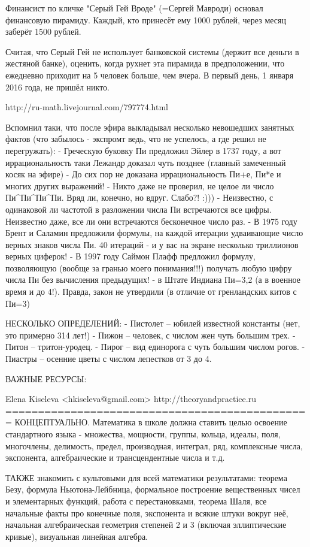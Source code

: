 Финансист по кличке "Серый Гей Вроде" (=Сергей Мавроди) основал финансовую 
пирамиду. Каждый, кто принесёт ему 1000 рублей, через месяц заберёт 1500 рублей.

Считая, что Серый Гей не использует банковской системы (держит все деньги в жестяной
банке), оценить, когда рухнет эта пирамида в предположении, что ежедневно приходит на 
5 человек больше, чем вчера. В первый день, 1 января 2016 года, не пришёл никто.

http://ru-math.livejournal.com/797774.html

Вспомнил таки, что после эфира выкладывал несколько невошедших
занятных фактов (что забылось - экспромт ведь, что не успелось, а
где решил не перегружать):
- Греческую буковку Пи предложил Эйлер в 1737 году, а вот иррациональность
таки Лежандр доказал чуть позднее (главный замеченный косяк на эфире)
- До сих пор не доказана иррациональность Пи+е, Пи*е и многих других выражений!
- Никто даже не проверил, не целое ли число Пи^Пи^Пи^Пи. Вряд ли, конечно, но вдруг. Слабо?! :)))
- Неизвестно, с одинаковой ли частотой в разложении числа Пи встречаются все цифры.
Неизвестно даже, все ли они встречаются бесконечное число раз.
- В 1975 году Брент и Саламин предложили формулы, на каждой итерации удваивающие
число верных знаков числа Пи. 40 итераций - и у вас на экране несколько триллионов
верных циферок!
- В 1997 году Саймон Плафф предложил формулу, позволяющую (вообще за гранью
моего понимания!!!) получать любую цифру числа Пи без вычисления предыдущих!
- в Штате Индиана Пи=3,2 (а в военное время и до 4!). Правда, закон не утвердили
(в отличие от гренландских китов с Пи=3)

НЕСКОЛЬКО ОПРЕДЕЛЕНИЙ:
- Пистолет – юбилей известной константы (нет, это примерно 314 лет!)
- Пижон – человек, с числом жен чуть большим трех.
- Питон – тритон-уродец.
- Пирог – вид единорога с чуть большим числом рогов.
- Пиастры – осенние цветы с числом лепестков от 3 до 4.

ВАЖНЫЕ РЕСУРСЫ:

Elena Kiseleva <hkiseleva@gmail.com> http://theoryandpractice.ru
===============================================
КОНЦЕПТУАЛЬНО. Математика в школе должна ставить целью освоение
стандартного языка - множества, мощности, группы, кольца, идеалы, поля, 
многочлены, делимость, предел, производная, интеграл, ряд, комплексные
числа, экспонента, алгебраические и трансцендентные числа и т.д. 

ТАКЖЕ знакомить с культовыми для всей математики результатами:
теорема Безу, формула Ньютона-Лейбница, формальное построение 
вещественных чисел и элементарных функций, работа с перестановками, 
теорема Шаля, все начальные факты про конечные поля, экспонента и
всякие штуки вокруг неё, начальная алгебраическая геометрия степеней
2 и 3 (включая эллиптические кривые), визуальная линейная алгебра.

